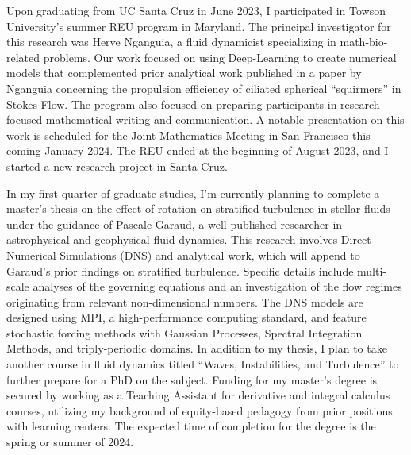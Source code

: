 \documentclass{article}
\begin{document}
Upon graduating from UC Santa Cruz in June 2023, I participated in Towson University's summer REU program in Maryland. The principal investigator for this research was Herve Nganguia, a fluid dynamicist specializing in math-bio-related problems. Our work focused on using Deep-Learning to create numerical models that complemented prior analytical work published in a paper by Nganguia concerning the propulsion efficiency of ciliated spherical ``squirmers'' in Stokes Flow. The program also focused on preparing participants in research-focused mathematical writing and communication. A notable presentation on this work is scheduled for the Joint Mathematics Meeting in San Francisco this coming January 2024. The REU ended at the beginning of August 2023, and I started a new research project in Santa Cruz. 

In my first quarter of graduate studies, I'm currently planning to complete a master's thesis on the effect of rotation on stratified turbulence in stellar fluids under the guidance of Pascale Garaud, a well-published researcher in astrophysical and geophysical fluid dynamics. This research involves Direct Numerical Simulations (DNS) and analytical work, which will append to Garaud's prior findings on stratified turbulence. Specific details include multi-scale analyses of the governing equations and an investigation of the flow regimes originating from relevant non-dimensional numbers. The DNS models are designed using MPI, a high-performance computing standard, and feature stochastic forcing methods with Gaussian Processes, Spectral Integration Methods, and triply-periodic domains. In addition to my thesis, I plan to take another course in fluid dynamics titled ``Waves, Instabilities, and Turbulence'' to further prepare for a PhD on the subject. Funding for my master's degree is secured by working as a Teaching Assistant for derivative and integral calculus courses, utilizing my background of equity-based pedagogy from prior positions with learning centers. The expected time of completion for the degree is the spring or summer of 2024. 
\end{document}
